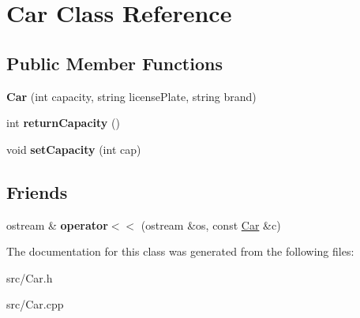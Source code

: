 \hypertarget{class_car}{}\section{Car Class Reference}
\label{class_car}
\subsection*{Public Member Functions}
\begin{DoxyCompactItemize}
\item 
{\bfseries Car} (int capacity, string license\+Plate, string brand)\hypertarget{class_car_adf1bf0f46fb3debe42a0ebe339694f94}{}\label{class_car_adf1bf0f46fb3debe42a0ebe339694f94}

\item 
int {\bfseries return\+Capacity} ()\hypertarget{class_car_a2deb075439fe60627ded29c35ec1d6c8}{}\label{class_car_a2deb075439fe60627ded29c35ec1d6c8}

\item 
void {\bfseries set\+Capacity} (int cap)\hypertarget{class_car_ae6def8b680b4374df4ab04c145805bc5}{}\label{class_car_ae6def8b680b4374df4ab04c145805bc5}

\end{DoxyCompactItemize}
\subsection*{Friends}
\begin{DoxyCompactItemize}
\item 
ostream \& {\bfseries operator$<$$<$} (ostream \&os, const \hyperlink{class_car}{Car} \&c)\hypertarget{class_car_a257ed80570a174c7aaf65c9de8032326}{}\label{class_car_a257ed80570a174c7aaf65c9de8032326}

\end{DoxyCompactItemize}


The documentation for this class was generated from the following files\+:\begin{DoxyCompactItemize}
\item 
src/Car.\+h\item 
src/Car.\+cpp\end{DoxyCompactItemize}

